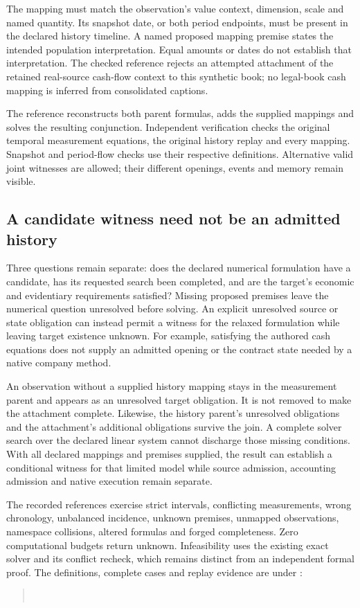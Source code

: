 The mapping must match the observation's value context, dimension, scale and
named quantity. Its snapshot date, or both period endpoints, must be present
in the declared history timeline. A named proposed mapping premise states the
intended population interpretation. Equal amounts or dates do not establish
that interpretation. The checked reference rejects an attempted attachment
of the retained real-source cash-flow context to this synthetic book; no
legal-book cash mapping is inferred from consolidated captions.

The  reference reconstructs both parent
formulas, adds the supplied mappings and solves the resulting conjunction.
Independent verification checks the original temporal measurement equations,
the original history replay and every mapping. Snapshot and period-flow checks
use their respective definitions. Alternative valid joint witnesses are allowed;
their different openings, events and memory remain visible.

\subsection{A candidate witness need not be an admitted history}

Three questions remain separate: does the declared numerical formulation have
a candidate, has its requested search been completed, and are the target's
economic and evidentiary requirements satisfied? Missing proposed premises
leave the numerical question unresolved before solving. An explicit unresolved
source or state obligation can instead permit a witness for the relaxed
formulation while leaving target existence unknown. For example, satisfying
the authored cash equations does not supply an admitted opening or the contract
state needed by a native company method.

An observation without a supplied history mapping stays in the measurement
parent and appears as an unresolved target obligation. It is not removed to
make the attachment complete. Likewise, the history parent's unresolved
obligations and the attachment's additional obligations survive the join.
A complete solver search over the declared linear system cannot discharge
those missing conditions. With all declared mappings and premises supplied,
the result can establish a conditional witness for that limited model while
source admission, accounting admission and native execution remain separate.

The recorded references exercise strict intervals, conflicting measurements,
wrong chronology, unbalanced incidence, unknown premises, unmapped observations,
namespace collisions, altered formulas and forged completeness. Zero computational
budgets return unknown. Infeasibility uses the existing exact solver and its
conflict recheck, which remains distinct from an independent formal proof.
The definitions, complete cases and replay evidence are under
:
\begin{quote}\small
{}\\
\end{quote}

